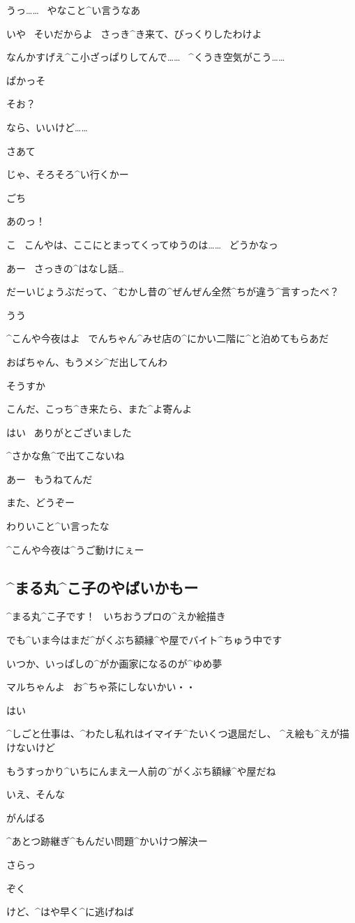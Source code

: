\Alpha うっ……
\ やなこと^{い}{言}うなあ

\Ayase いや
\ そいだからよ
\ さっき^{き}{来}て、びっくりしたわけよ

\Ayase なんかすげえ^{こ}{小}ざっぱりしてんで……
\ ^{くうき}{空気}がこう……

\Ayase ぱかっそ

\Alpha そお？

\Alpha なら、いいけど……

\page
\Ayase さあて

\Ayase じゃ、そろそろ^{い}{行}くかー

\Ayase ごち

\Alpha あのっ！

\Alpha こ
\ こんやは、ここにとまってくってゆうのは……
\ どうかなっ

\Ayase あー
\ さっきの^{はなし}{話}…

\page
\Ayase だーいじょうぶだって、^{むかし}{昔}の^{ぜんぜん}{全然}^{ちが}{違}う^{言}{す}ったべ？

\Alpha うう

\Ayase ^{こんや}{今夜}はよ
\ でんちゃん^{みせ}{店}の^{にかい}{二階}に^{と}{泊}めてもらあだ

\Ayase おばちゃん、もうメシ^{だ}{出}してんわ

\Alpha そうすか

\Ayase こんだ、こっち^{き}{来}たら、また^{よ}{寄}んよ

\Alpha はい
\ ありがとございました

\page
\Alpha ^{さかな}{魚}^{で}{出}てこないね

\Ayase あー
\ もうねてんだ

\Alpha また、どうぞー

\page
\Ayase わりいこと^{い}{言}ったな

\page[167]
\Alpha ^{こんや}{今夜}は^{うご}{動}けにぇー


\subsection{^{まる}{丸}^{こ}{子}のやばいかもー}
\Maruko ^{まる}{丸}^{こ}{子}です！
\ いちおうプロの^{えか}{絵描}き

\Maruko でも^{いま}{今}はまだ^{がくぶち}{額縁}^{や}{屋}でバイト^{ちゅう}{中}です

\Maruko いつか、いっぱしの^{がか}{画家}になるのが^{ゆめ}{夢}

\Person マルちゃんよ
\ お^{ちゃ}{茶}にしないかい・・

\Maruko はい

\Maruko ^{しごと}{仕事}は、^{わたし}{私}れはイマイチ^{たいくつ}{退屈}だし、
^{え}{絵}も^{えが}{描}けないけど

\Person もうすっかり^{いちにんまえ}{一人前}の^{がくぶち}{額縁}^{や}{屋}だね

\Maruko いえ、そんな

\Maruko がんばる

\Person ^{あとつ}{跡継}ぎ^{もんだい}{問題}^{かいけつ}{解決}ー

\Person さらっ

\Maruko ぞく

\Maruko けど、^{はや}{早}く^{に}{逃}げねば
